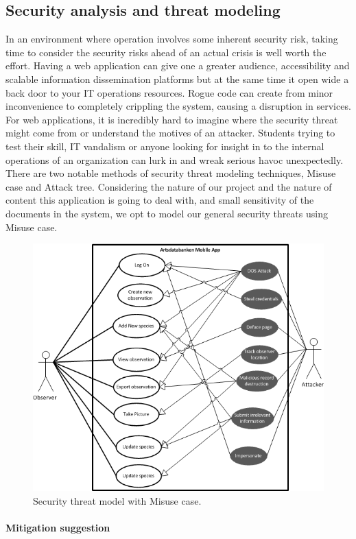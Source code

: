 \subsection{Security analysis and threat modeling}
In an environment where operation involves some inherent security risk, taking time to consider the security risks ahead of an actual crisis is well worth the effort. Having a web application can give one a greater audience, accessibility and scalable information dissemination platforms but at the same time it open wide a back door to your IT operations resources. Rogue code can create from minor inconvenience to completely crippling the system, causing a disruption in services. For web applications, it is incredibly hard to imagine where the security threat might come from or understand the motives of an attacker. Students trying to test their skill, IT vandalism or anyone looking for insight in to the internal operations of an organization can lurk in and wreak serious havoc unexpectedly.
\\[1cm]
There are two notable methods of security threat modeling techniques, Misuse case and Attack tree. Considering the nature of our project and the nature of content this application is going to deal with, and small sensitivity of the documents in the system, we opt to model our general security threats using Misuse case.
\begin{figure}[htb]
	\centering
    \includegraphics[width=1.0\textwidth]{reqspec/misusecase.png}
	\caption{Security threat model with Misuse case.}
	\label{fig:usecase}
\end{figure} 
\paragraph{Mitigation suggestion} 